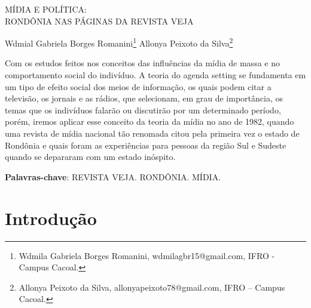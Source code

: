 \documentclass[article,12pt,onesidea,4paper,english,brazil]{abntex2}
\begin{document}
	
	
	\frenchspacing 
	
	\begin{center}
		\LARGE MÍDIA E POLÍTICA: \\RONDÔNIA NAS PÁGINAS DA REVISTA VEJA
		
		\normalsize
	Wdmial Gabriela Borges Romanini\footnote{Wdmila Gabriela Borges Romanini, wdmilagbr15@gmail.com, IFRO - Campus Cacoal.} 
	Allonya Peixoto da Silva\footnote{Allonya Peixoto da Silva, allonyapeixoto78@gmail.com, IFRO – Campus Cacoal.} 
		
	\end{center}
	
	\begin{resumoumacoluna}
		Com os estudos feitos nos conceitos das influências da mídia de massa e no comportamento social do indivíduo. A teoria do agenda setting se fundamenta  em um tipo de efeito social dos meios de informação, os quais podem citar a televisão, os jornais e as rádios, que selecionam, em grau de importância, os temas que os indivíduos falarão ou discutirão por um determinado período, porém, iremos aplicar esse conceito da teoria da mídia no ano de 1982, quando uma revista de mídia nacional tão renomada citou pela primeira vez o estado de Rondônia e quais foram as experiências para pessoas da região Sul e Sudeste quando se depararam com um estado inóspito.
		
		\vspace{\onelineskip}
		
		\noindent
		\textbf{Palavras-chave}: REVISTA VEJA. RONDÔNIA. MÍDIA.
	\end{resumoumacoluna}
	
	\section*{Introdução}
	
\end{document}

